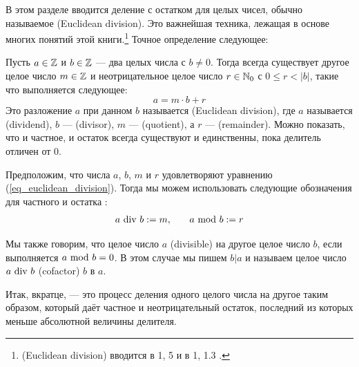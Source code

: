 В этом разделе вводится деление с остатком для целых чисел, обычно называемое  (Euclidean division). Это важнейшая техника, лежащая в основе многих понятий этой книги.\footnote{ (Euclidean division) вводится в \chaptname{} 1, \secname{} 5 \cite{mignotte-1992} и в \chaptname{} 1, \secname{} 1.3 \cite{cohen-2010}.} Точное определение следующее:

Пусть $ a \in \mathbb{Z} $ и $ b \in \mathbb{Z} $ — два целых числа с $b\neq 0$. Тогда всегда существует другое целое число $ m \in \mathbb{Z} $ и неотрицательное целое число $ r \in \mathbb{N}_0 $ с $ 0 \leq r <|b| $, такие что выполняется следующее:
\begin{equation}
\label{eq_euclidean_division}
a = m \cdot b + r
\end{equation}
Это разложение $a$ при данном $b$ называется  (Euclidean division), где $ a $ называется  (dividend), $ b $ —  (divisor), $m$ —  (quotient), а $r$ —  (remainder). Можно показать, что и частное, и остаток всегда существуют и единственны, пока делитель отличен от $0$.
\begin{notation}
\label{eq_euclidean_division_notation}
Предположим, что числа $a$, $b$, $m$ и $r$ удовлетворяют уравнению (\ref{eq_euclidean_division}). Тогда мы можем использовать следующие обозначения для частного и остатка :
\begin{equation}
\label{def_integer_division_and_modulus}
\begin{array}{lcr}
a \text{ div } b: = m, & & a \text{ mod } b: = r
\end{array}
\end{equation}

Мы также говорим, что целое число $ a $  (divisible) на другое целое число $ b $, если выполняется $ a \text{ mod } b = 0 $. В этом случае мы пишем $ b | a $ и называем целое число $a \text{ div } b$  (cofactor) $b$ в $a$.\label{def:cofactor}
\end{notation}
Итак, вкратце,  — это процесс деления одного целого числа на другое таким образом, который даёт частное и неотрицательный остаток, последний из которых меньше абсолютной величины делителя.

